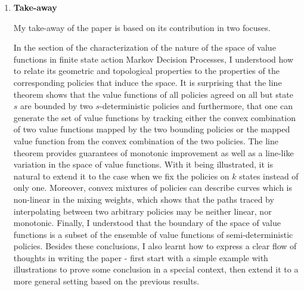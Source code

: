 \begin{Solution}
\begin{enumerate} [label=\alph*)]
        If we interpolate between two policies that differ in $k$ states instead of only in a single one, Lemma 3 shows that the induced space of value function loses at least $k$ degrees of freedom, specifically that it lies in a $|\mathcal{S}| - k$ dimensional affine vector space. As a more general conclusion, Lemma 3 in turn explains the line theorem, i.e., for $k = |\mathcal{S}| - 1$, the value functions lie on a line.
        
        \item
        \textbf{Take-away}
        
        My take-away of the paper is based on its contribution in two focuses.
        
        In the section of the characterization of the nature of the space of value functions in finite state action Markov Decision Processes, I understood how to relate its geometric and topological properties to the properties of the corresponding policies that induce the space. It is surprising that the line theorem shows that the value functions of all policies agreed on all but state $s$ are bounded by two $s$-deterministic policies and furthermore, that one can generate the set of value functions by tracking either the convex combination of two value functions mapped by the two bounding policies or the mapped value function from the convex combination of the two policies. The line theorem provides guarantees of monotonic improvement as well as a line-like variation in the space of value functions. With it being illustrated, it is natural to extend it to the case when we fix the policies on $k$ states instead of only one. Moreover, convex mixtures of policies can describe curves which is non-linear in the mixing weights, which shows that the paths traced by interpolating between two arbitrary policies may be neither linear, nor monotonic. Finally, I understood that the boundary of the space of value functions is a subset of the ensemble of value functions of semi-deterministic policies. Besides these conclusions, I also learnt how to express a clear flow of thoughts in writing the paper - first start with a simple example with illustrations to prove some conclusion in a special context, then extend it to a more general setting based on the previous results. 
        

\end{enumerate}
\end{Solution}
